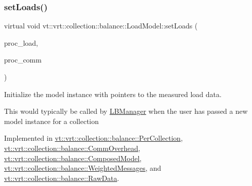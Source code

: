 \mbox{\label{structvt_1_1vrt_1_1collection_1_1balance_1_1_load_model_a07512b8d95025a21a7c25cc3fdb817ad}} 
\subsubsection{\texorpdfstring{set\+Loads()}{setLoads()}}
{\footnotesize\ttfamily virtual void vt\+::vrt\+::collection\+::balance\+::\+Load\+Model\+::set\+Loads (\begin{DoxyParamCaption}\item[{std\+::unordered\+\_\+map$<$ \hyperlink{namespacevt_a46ce6733d5cdbd735d561b7b4029f6d7}{Phase\+Type}, \hyperlink{namespacevt_1_1vrt_1_1collection_1_1balance_a5339303db2e1ce964d783a53fd74e6b1}{Load\+Map\+Type} $>$ const $\ast$}]{proc\+\_\+load,  }\item[{std\+::unordered\+\_\+map$<$ \hyperlink{namespacevt_a46ce6733d5cdbd735d561b7b4029f6d7}{Phase\+Type}, \hyperlink{namespacevt_1_1vrt_1_1collection_1_1balance_a01ee1fb0ae2da1d2ab7fdca3be9ae351}{Comm\+Map\+Type} $>$ const $\ast$}]{proc\+\_\+comm }\end{DoxyParamCaption})\hspace{0.3cm}{\ttfamily [pure virtual]}}



Initialize the model instance with pointers to the measured load data. 

This would typically be called by \hyperlink{structvt_1_1vrt_1_1collection_1_1balance_1_1_l_b_manager}{L\+B\+Manager} when the user has passed a new model instance for a collection 

Implemented in \hyperlink{structvt_1_1vrt_1_1collection_1_1balance_1_1_per_collection_aba8f472fbe40c44c9f0f9028afe29cfc}{vt\+::vrt\+::collection\+::balance\+::\+Per\+Collection}, \hyperlink{structvt_1_1vrt_1_1collection_1_1balance_1_1_comm_overhead_a5208f7952b3a327ca118e9be2f4c5a55}{vt\+::vrt\+::collection\+::balance\+::\+Comm\+Overhead}, \hyperlink{classvt_1_1vrt_1_1collection_1_1balance_1_1_composed_model_a3a7da5e81a933ea88f87a1226fd3b401}{vt\+::vrt\+::collection\+::balance\+::\+Composed\+Model}, \hyperlink{structvt_1_1vrt_1_1collection_1_1balance_1_1_weighted_messages_ad0e6b88668ac59f4fb376a2dba81e593}{vt\+::vrt\+::collection\+::balance\+::\+Weighted\+Messages}, and \hyperlink{structvt_1_1vrt_1_1collection_1_1balance_1_1_raw_data_aa29d4f35b5d3afb4690cef64fb65b887}{vt\+::vrt\+::collection\+::balance\+::\+Raw\+Data}.

